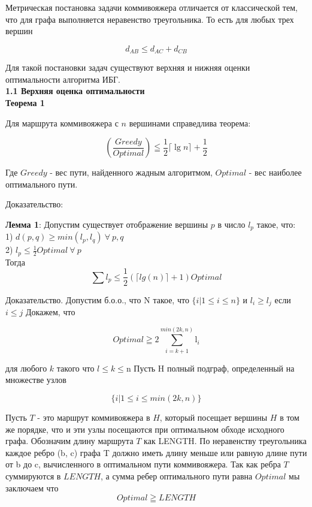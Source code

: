 \documentclass[a4paper, 14pt]{extarticle}
\begin{document}
Метрическая постановка задачи коммивояжера отличается от классической тем, что для графа выполняется неравенство треугольника. То есть для любых трех вершин

\begin{equation}
d_{AB} \leq d_{AC} + d_{CB}
\end{equation}

Для такой постановки задач существуют верхняя и нижняя оценки оптимальности алгоритма ИБГ. \\


\textbf{1.1 Верхняя оценка оптимальности}\\

\textbf{Теорема 1}

Для маршрута коммивояжера с $n$ вершинами справедлива теорема:

\begin{equation}
	(\frac{Greedy}{Optimal}) \leqq \frac{1}{2}\lceil{\lg n}\rceil + \frac{1}{2}
\end{equation}

Где $Greedy$ - вес пути, найденного жадным алгоритмом, $Optimal$ - вес наиболее оптимального пути.

Доказательство:

\textbf{Лемма 1}: Допустим существует отображение вершины $p$ в число $l_p$ такое, что:\\
1) $d(p,q) \geq min(l_p, l_q) \: \forall \: p,q$\\
2) $l_p \leq \frac{1}{2}Optimal\: \forall \: p $\\
Тогда 
\begin{equation}
\sum l_p \leq \frac{1}{2}(\lceil lg(n)\rceil+1)Optimal
\end{equation}

Доказательство.
Допустим б.о.о., что N такое, что  $\{i|1 \leq i \leq n \}$  и $l_i \geq l_j$ если $i \leq j$
Докажем, что 

\begin{equation}\label{metriclowerbound}
	{Optimal} \geqq 2\sum_{i=k+1}^{min(2k,n)}\mathrm{l}_i
\end{equation}

для любого $k$ такого что $l \leq k \leq $n
Пусть H полный подграф, определенный на множестве узлов

\begin{equation}
	{\{i|1 \leq i \leq min(2k, n)\}}
\end{equation}

Пусть $T$ - это маршрут коммивояжера в $H$, который посещает вершины $H$ в том же порядке, что и эти узлы посещаются при оптимальном обходе исходного графа. Обозначим длину маршрута $T$ как LENGTH. По неравенству треугольника каждое ребро (b, c) графа T должно иметь длину меньше или равную длине пути от b до c, вычисленного в оптимальном пути коммивояжера. Так как ребра $T$ суммируются в $LENGTH$, а сумма ребер оптимального пути равна $Optimal$ мы заключаем что
\begin{equation}
	{Optimal} \geqq {LENGTH}
\end{equation}
\end{document}
